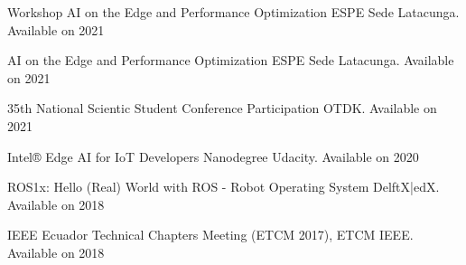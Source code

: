 
\begin{cvhonors}

  \cvhonor
    {Workshop AI on the Edge and Performance Optimization} %
    {ESPE Sede Latacunga. Available on } %
    {} %
    {2021} %

  \cvhonor
    {AI on the Edge and Performance Optimization} %
    {ESPE Sede Latacunga. Available on } %
    {} %
    {2021} %

  \cvhonor
    {35th National Scientic Student Conference Participation} %
    {OTDK. Available on } %
    {} %
    {2021} %

  \cvhonor
    {Intel® Edge AI for IoT Developers Nanodegree} %
    {Udacity. Available on } %
    {} %
    {2020} %

  \cvhonor
    {ROS1x: Hello (Real) World with ROS - Robot Operating System} %
    {DelftX|edX. Available on } %
    {} %
    {2018} %

  \cvhonor
    {IEEE Ecuador Technical Chapters Meeting (ETCM 2017),} %
    {ETCM IEEE. Available on } %
    {} %
    {2018} %

\end{cvhonors}
